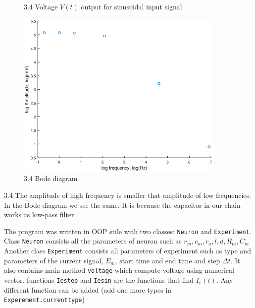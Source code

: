 \documentclass[]{report}
\begin{document}
\begin{figure}[h]
	\hfill
	\caption*{3.4 Voltage $V(t)$ output for sinusoidal input signal}
   	
\end{figure}
\begin{figure}[h!]
	\centering
	\includegraphics[width=0.9\textwidth]{exp7.eps}
	\caption*{3.4 Bode diagram}
	\label{fig:exp1}
\end{figure}
3.4 The amplitude of high frequency is smaller that amplitude of low frequencies. In the Bode diagram we see the same. It is because the capacitor in our chain works as low-pass filter.

The program was written in OOP stile with two classes: \texttt{Neuron} and \texttt{Experiment}. 
Class \texttt{Neuron} consists all the parameters of neuron such as $r_m, c_m, r_a, l, d, R_m, C_m$
Another class \texttt{Experiment} consists all parameters of experiment such as type and parameters of the current signal, $E_m$, start time and end time and step $\Delta t$. It also contains main method \texttt{voltage} which compute voltage using numerical vector.
functions \texttt{Iestep} and \texttt{Iesin} are the functions that find $I_e(t)$. Any different function can be added (add one more types in \texttt{Experement.currenttype})  
\end{document}
